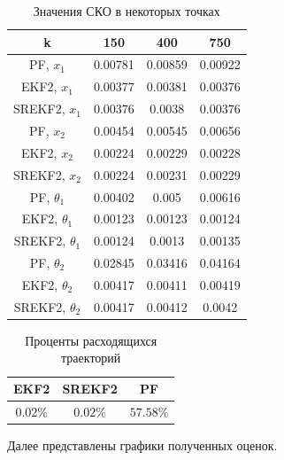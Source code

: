 \documentclass[a4paper,12pt]{article}
\begin{document}
\begin{table}[h!]
    \centering
    \begin{tabular}{|c|ccc|}
        \hline
        k &  150 & 400 & 750\\
         \hline
        PF, $x_1$ & 0.00781 & 0.00859 & 0.00922\\
        EKF2, $x_1$ & 0.00377 & 0.00381 & 0.00376\\
        SREKF2, $x_1$ & 0.00376 & 0.0038 & 0.00376\\
        \hline
        PF, $x_2$ &  0.00454 & 0.00545 & 0.00656\\
        EKF2, $x_2$ & 0.00224 & 0.00229 & 0.00228\\
        SREKF2, $x_2$ & 0.00224 & 0.00231 & 0.00229\\
        \hline
        PF, $\theta_1$ & 0.00402 & 0.005 & 0.00616\\
        EKF2, $\theta_1$ & 0.00123 & 0.00123 & 0.00124\\
        SREKF2, $\theta_1$ & 0.00124 & 0.0013 & 0.00135\\
        \hline
        PF, $\theta_2$ & 0.02845 & 0.03416 & 0.04164\\
        EKF2, $\theta_2$ & 0.00417 & 0.00411 & 0.00419\\
        SREKF2, $\theta_2$ & 0.00417 & 0.00412 & 0.0042 \\
        \hline
    \end{tabular}
    \caption{Значения СКО в некоторых точках}
    \label{tab:emse}
\end{table}

\begin{table}[h!]
    \centering
    \begin{tabular}{|c|c|c|}
        \hline
        EKF2      & SREKF2    & PF \\
        \hline
        $0.02 \%$ & $0.02 \%$ & $57.58 \%$ \\
        \hline
    \end{tabular}
    \caption{Проценты расходящихся траекторий}
    \label{tab:divergence_percentage}
\end{table}

Далее представлены графики полученных оценок.
\end{document}
